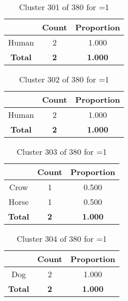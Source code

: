 \begin{table}[ht!]
\centering
\begin{tabular}{|c|c|c|}
\hline
\bf \Spec{} &\bf Count &\bf Proportion\\ \hline \hline
Human & 2 & 1.000\\ \hline
\hline
\bf Total & \bf 2 & \bf 1.000\\ \hline
\end{tabular}
\label{tab:cluster:301:1}
\caption{Cluster 301 of 380 for \minneigh{}=1}
\end{table}

\begin{table}[ht!]
\centering
\begin{tabular}{|c|c|c|}
\hline
\bf \Spec{} &\bf Count &\bf Proportion\\ \hline \hline
Human & 2 & 1.000\\ \hline
\hline
\bf Total & \bf 2 & \bf 1.000\\ \hline
\end{tabular}
\label{tab:cluster:302:1}
\caption{Cluster 302 of 380 for \minneigh{}=1}
\end{table}

\begin{table}[ht!]
\centering
\begin{tabular}{|c|c|c|}
\hline
\bf \Spec{} &\bf Count &\bf Proportion\\ \hline \hline
Crow & 1 & 0.500\\ \hline
Horse & 1 & 0.500\\ \hline
\hline
\bf Total & \bf 2 & \bf 1.000\\ \hline
\end{tabular}
\label{tab:cluster:303:1}
\caption{Cluster 303 of 380 for \minneigh{}=1}
\end{table}

\begin{table}[ht!]
\centering
\begin{tabular}{|c|c|c|}
\hline
\bf \Spec{} &\bf Count &\bf Proportion\\ \hline \hline
Dog & 2 & 1.000\\ \hline
\hline
\bf Total & \bf 2 & \bf 1.000\\ \hline
\end{tabular}
\label{tab:cluster:304:1}
\caption{Cluster 304 of 380 for \minneigh{}=1}
\end{table}

